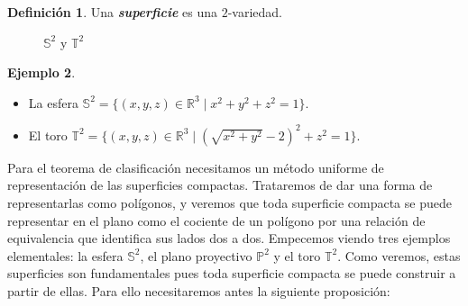 \documentclass[10pt]{report}
\newcommand{\R}{\mathbb{R}}
\newcommand{\Esfera}{\mathbb{S}^2}
\newcommand{\Toro}{\mathbb{T}^2}
\newcommand{\Proyectivo}{\mathbb{P}^2}
\theoremstyle{definition}
\newtheorem{defin}{Definición}[section]
\newtheorem{eje}[defin]{Ejemplo}
\begin{document}
\begin{defin}%
Una \textbf{\emph{superficie}} es una $2$-variedad.
\end{defin}


\begin{figure}[h]%
	\begin{center}
	\caption{$\mathbb{S}^2$ y $\mathbb{T}^2$}
	\end{center}
\end{figure}

\begin{eje}%
\begin{itemize}
\item La esfera $\mathbb{S}^2=\{(x,y,z) \in \R^3\mid  x^2+y^2+z^2=1\}$.

\item El toro $\mathbb{T}^2=\{(x,y,z)\in \R^3\mid  (\sqrt{x^2+y^2}-2)^2+z^2=1\}$.
\end{itemize}

\end{eje}



Para el teorema de clasificación necesitamos un método uniforme de representación de las superficies compactas. Trataremos de dar una forma de representarlas como polígonos, y veremos que toda superficie compacta se puede representar en el plano como el cociente de un polígono por una relación de equivalencia que identifica sus lados dos a dos. Empecemos viendo tres ejemplos elementales: la esfera $\Esfera$, el plano proyectivo $\Proyectivo$ y el toro $\Toro$. Como veremos, estas superficies son fundamentales pues toda superficie compacta se puede construir a partir de ellas. 
Para ello necesitaremos antes la siguiente proposición:
\end{document}
